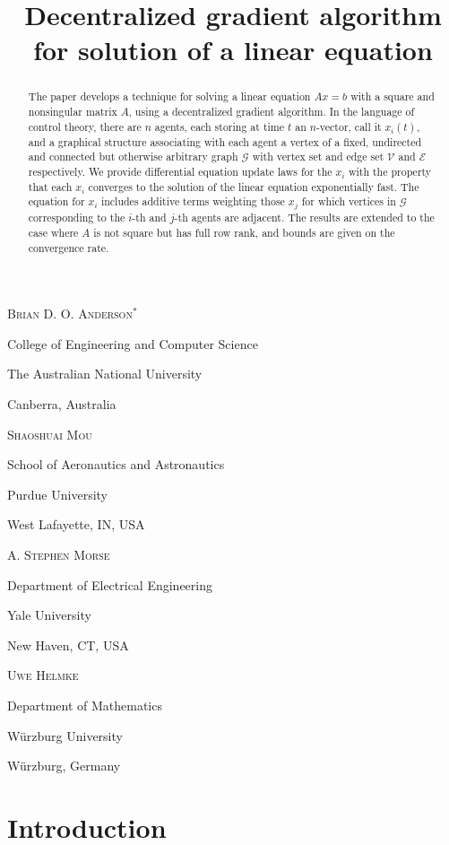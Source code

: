 \documentclass{aims}
\title[Decentralized gradient algorithm for linear equations] {Decentralized gradient algorithm for solution of a linear equation}
\author[Anderson and Mou and Morse and Helmke]{}
\begin{document}
\maketitle

\centerline{\scshape Brian D. O. Anderson$^*$}
\medskip
{\footnotesize
\centerline{College of Engineering and Computer Science }
   \centerline{The Australian National University}
   \centerline{ Canberra, Australia}
} 

\medskip

\centerline{\scshape Shaoshuai Mou}
\medskip
{\footnotesize
\centerline{ School of Aeronautics and Astronautics}
   \centerline{Purdue University}
   \centerline{West Lafayette, IN, USA}
}

\medskip

\centerline{\scshape A. Stephen Morse}
\medskip
{\footnotesize
\centerline{Department of Electrical Engineering}
   \centerline{Yale University}
   \centerline{New Haven, CT, USA}
}

\medskip

\centerline{\scshape Uwe Helmke}
\medskip
{\footnotesize
\centerline{Department of Mathematics}
   \centerline{W{\"u}rzburg University}
   \centerline{W{\"u}rzburg, Germany}
}


\bigskip




\begin{abstract}
The paper develops a technique for solving a linear equation $Ax=b$ with a square and nonsingular matrix $A$, using a decentralized gradient algorithm. In the language of control theory, there are $n$ agents, each storing at time $t$ an $n$-vector, call it $x_i(t)$, and a graphical structure associating with each agent a vertex of a fixed, undirected and connected but otherwise arbitrary graph $\mathcal G$ with vertex set and edge set $\mathcal V$ and $\mathcal E$ respectively.  We provide differential equation update laws  for the $x_i$ with the property that each $x_i$ converges to the solution of the linear equation exponentially fast. The equation for $x_i$ includes additive terms weighting those $x_j$ for which vertices in $\mathcal G$ corresponding to the $i$-th and $j$-th agents are adjacent. The results are extended to the case where $A$ is not square but has full row rank, and bounds are given on the convergence rate.
\end{abstract}

\section{Introduction}
\end{document}
